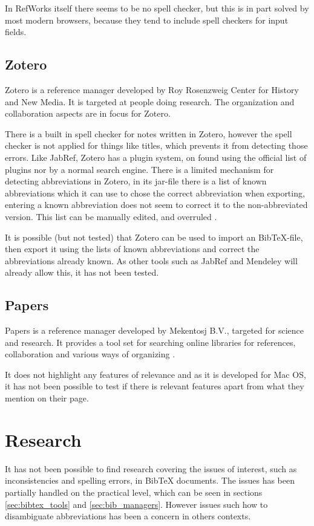 In RefWorks itself there seems to be no spell checker, but this is in
part solved by most modern browsers, because they tend to include
spell checkers for input fields.

\subsection{Zotero}
Zotero is a reference manager developed by Roy Rosenzweig Center for
History and New Media.  It is targeted at people doing research.  The
organization and collaboration aspects are in focus for
Zotero\cite{zotero_features}.

There is a built in spell checker for notes written in Zotero, however
the spell checker is not applied for things like titles, which
prevents it from detecting those errors.  Like JabRef, Zotero has a
plugin system, on found using the official list of plugins
\cite{zotero_plugins} nor by a normal search engine. There is a
limited mechanism for detecting abbreviations in Zotero, in its
jar-file there is a list of known abbreviations which it can use to
chose the correct abbreviation when exporting, entering a known
abbreviation does not seem to correct it to the non-abbreviated
version.  This list can be manually edited, and overruled
\cite{zotero_abbreviations}.

It is possible (but not tested) that Zotero can be used to import an
Bib{\TeX}-file, then export it using the lists of known abbreviations
and correct the abbreviations already known.  As other tools such as
JabRef and Mendeley will already allow this, it has not been tested.

\subsection{Papers}
Papers is a reference manager developed by Mekentosj B.V., targeted
for science and research.  It provides a tool set for searching online
libraries for references, collaboration and various ways of
organizing \cite{papers_features}.

It does not highlight any features of relevance \cite{papers_features}
and as it is developed for Mac OS, it has not been possible to test if
there is relevant features apart from what they mention on their page.

\section{Research }
It has not been possible to find research covering the issues of
interest, such as inconsistencies and spelling errors, in Bib{\TeX}
documents.  The issues has been partially handled on the practical
level, which can be seen in sections \ref{sec:bibtex_tools} and
\ref{sec:bib_managers}.  However issues such how to disambiguate
abbreviations has been a concern in others contexts.

